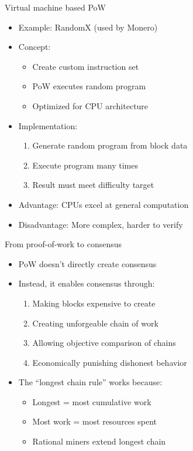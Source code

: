 \documentclass[aspectratio=169, lualatex, handout]{beamer}
\begin{document}
\begin{frame}{Virtual machine based PoW}
	\begin{itemize}
		\item Example: RandomX (used by Monero)
		\item Concept:
		      \begin{itemize}
			      \item Create custom instruction set
			      \item PoW executes random program
			      \item Optimized for CPU architecture
		      \end{itemize}
		\item Implementation:
		      \begin{enumerate}
			      \item Generate random program from block data
			      \item Execute program many times
			      \item Result must meet difficulty target
		      \end{enumerate}
		\item Advantage: CPUs excel at general computation
		\item Disadvantage: More complex, harder to verify
	\end{itemize}
\end{frame}

\begin{frame}{From proof-of-work to consensus}
	\begin{itemize}
		\item PoW doesn't directly create consensus
		\item Instead, it enables consensus through:
		      \begin{enumerate}
			      \item Making blocks expensive to create
			      \item Creating unforgeable chain of work
			      \item Allowing objective comparison of chains
			      \item Economically punishing dishonest behavior
		      \end{enumerate}
		\item The ``longest chain rule'' works because:
		      \begin{itemize}
			      \item Longest = most cumulative work
			      \item Most work = most resources spent
			      \item Rational miners extend longest chain
		      \end{itemize}
	\end{itemize}
\end{frame}
\end{document}
